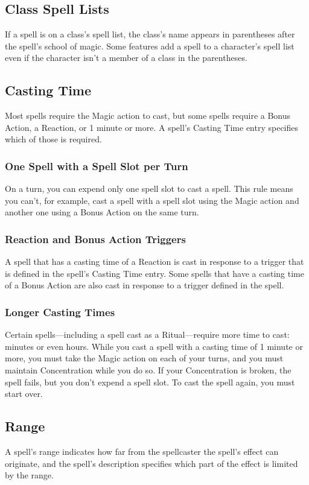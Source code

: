 \documentclass[10pt,a4paper,twoside,bg=print,twocolumn,openany,nodeprecatedcode]{dndbook}
\begin{document}
\subsection{Class Spell Lists}
If a spell is on a class's spell list, the class's name appears in parentheses after the spell's school of magic. Some features add a spell to a character's spell list even if the character isn't a member of a class in the parentheses.

\subsection{Casting Time}
Most spells require the Magic action to cast, but some spells require a Bonus Action, a Reaction, or 1 minute or more. A spell's Casting Time entry specifies which of those is required.

\subsubsection{One Spell with a Spell Slot per Turn}
On a turn, you can expend only one spell slot to cast a spell. This rule means you can't, for example, cast a spell with a spell slot using the Magic action and another one using a Bonus Action on the same turn.

\subsubsection{Reaction and Bonus Action Triggers}
A spell that has a casting time of a Reaction is cast in response to a trigger that is defined in the spell's Casting Time entry. Some spells that have a casting time of a Bonus Action are also cast in response to a trigger defined in the spell.

\subsubsection{Longer Casting Times}
Certain spells—including a spell cast as a Ritual—require more time to cast: minutes or even hours. While you cast a spell with a casting time of 1 minute or more, you must take the Magic action on each of your turns, and you must maintain Concentration while you do so. If your Concentration is broken, the spell fails, but you don't expend a spell slot. To cast the spell again, you must start over.

\subsection{Range}
A spell's range indicates how far from the spellcaster the spell's effect can originate, and the spell's description specifies which part of the effect is limited by the range.
\end{document}
